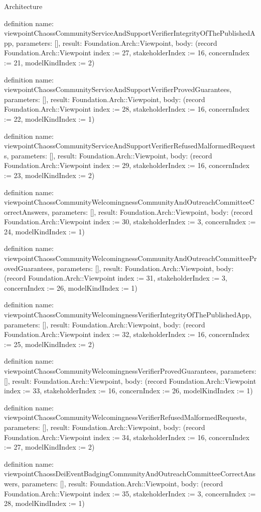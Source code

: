 \begin{lexlean}{Architecture}
\begin{semanticmodule}
definition{
  name: viewpointChaossCommunityServiceAndSupportVerifierIntegrityOfThePublishedApp,
  parameters: [],
  result: Foundation.Arch::Viewpoint,
  body: (record Foundation.Arch::Viewpoint {index := 27, stakeholderIndex := 16, concernIndex := 21, modelKindIndex := 2})
}

definition{
  name: viewpointChaossCommunityServiceAndSupportVerifierProvedGuarantees,
  parameters: [],
  result: Foundation.Arch::Viewpoint,
  body: (record Foundation.Arch::Viewpoint {index := 28, stakeholderIndex := 16, concernIndex := 22, modelKindIndex := 1})
}

definition{
  name: viewpointChaossCommunityServiceAndSupportVerifierRefusedMalformedRequests,
  parameters: [],
  result: Foundation.Arch::Viewpoint,
  body: (record Foundation.Arch::Viewpoint {index := 29, stakeholderIndex := 16, concernIndex := 23, modelKindIndex := 2})
}

definition{
  name: viewpointChaossCommunityWelcomingnessCommunityAndOutreachCommitteeCorrectAnswers,
  parameters: [],
  result: Foundation.Arch::Viewpoint,
  body: (record Foundation.Arch::Viewpoint {index := 30, stakeholderIndex := 3, concernIndex := 24, modelKindIndex := 1})
}

definition{
  name: viewpointChaossCommunityWelcomingnessCommunityAndOutreachCommitteeProvedGuarantees,
  parameters: [],
  result: Foundation.Arch::Viewpoint,
  body: (record Foundation.Arch::Viewpoint {index := 31, stakeholderIndex := 3, concernIndex := 26, modelKindIndex := 1})
}

definition{
  name: viewpointChaossCommunityWelcomingnessVerifierIntegrityOfThePublishedApp,
  parameters: [],
  result: Foundation.Arch::Viewpoint,
  body: (record Foundation.Arch::Viewpoint {index := 32, stakeholderIndex := 16, concernIndex := 25, modelKindIndex := 2})
}

definition{
  name: viewpointChaossCommunityWelcomingnessVerifierProvedGuarantees,
  parameters: [],
  result: Foundation.Arch::Viewpoint,
  body: (record Foundation.Arch::Viewpoint {index := 33, stakeholderIndex := 16, concernIndex := 26, modelKindIndex := 1})
}

definition{
  name: viewpointChaossCommunityWelcomingnessVerifierRefusedMalformedRequests,
  parameters: [],
  result: Foundation.Arch::Viewpoint,
  body: (record Foundation.Arch::Viewpoint {index := 34, stakeholderIndex := 16, concernIndex := 27, modelKindIndex := 2})
}

definition{
  name: viewpointChaossDeiEventBadgingCommunityAndOutreachCommitteeCorrectAnswers,
  parameters: [],
  result: Foundation.Arch::Viewpoint,
  body: (record Foundation.Arch::Viewpoint {index := 35, stakeholderIndex := 3, concernIndex := 28, modelKindIndex := 1})
}


\end{semanticmodule}
\end{lexlean}
